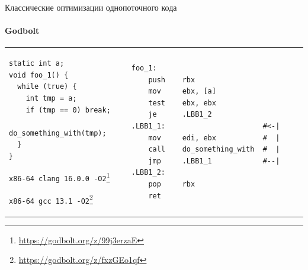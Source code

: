 \begin{frame}{Классические оптимизации однопоточного кода}
\framesubtitle{Godbolt}


\begin{tabular}{p{} p{}}


\begin{verbatim}
static int a;
void foo_1() {
  while (true) {
    int tmp = a;
    if (tmp == 0) break;
    do_something_with(tmp);
  }
}
\end{verbatim}

\texttt{x86-64 clang 16.0.0 -O2}\footnote{\tiny\url{https://godbolt.org/z/99j3erzaE}}

\texttt{x86-64 gcc 13.1 -O2}\footnote{\tiny\url{https://godbolt.org/z/fxzGEo1qf}}

&

\begin{verbatim}
foo_1:                                  
    push    rbx
    mov     ebx, [a]
    test    ebx, ebx
    je      .LBB1_2
.LBB1_1:                       #<-|    
    mov     edi, ebx           #  |
    call    do_something_with  #  |
    jmp     .LBB1_1            #--|
.LBB1_2:
    pop     rbx
    ret
\end{verbatim}

\end{tabular}

\pause
{}

\end{frame}


